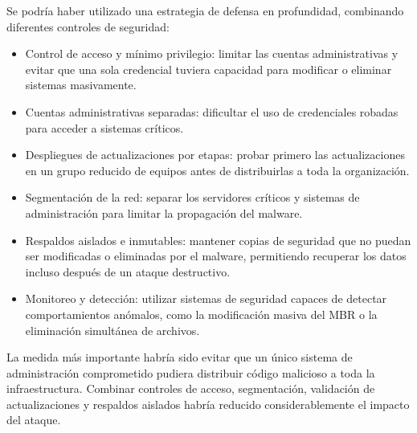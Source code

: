 \begin{respuesta}
Se podría haber utilizado una estrategia de defensa en profundidad, combinando diferentes controles de seguridad:
\begin{itemize}
  \item Control de acceso y mínimo privilegio: limitar las cuentas administrativas y evitar que una sola credencial tuviera capacidad para modificar o eliminar sistemas masivamente.  

\item Cuentas administrativas separadas: dificultar el uso de credenciales robadas para acceder a sistemas críticos.  

\item Despliegues de actualizaciones por etapas: probar primero las actualizaciones en un grupo reducido de equipos antes de distribuirlas a toda la organización.  

\item Segmentación de la red: separar los servidores críticos y sistemas de administración para limitar la propagación del malware.  

\item Respaldos aislados e inmutables: mantener copias de seguridad que no puedan ser modificadas o eliminadas por el malware, permitiendo recuperar los datos incluso después de un ataque destructivo.  

\item Monitoreo y detección: utilizar sistemas de seguridad capaces de detectar comportamientos anómalos, como la modificación masiva del MBR o la eliminación simultánea de archivos.  
\end{itemize}
La medida más importante habría sido evitar que un único sistema de administración comprometido pudiera distribuir código malicioso a toda la infraestructura. Combinar controles de acceso, segmentación, validación de actualizaciones y respaldos aislados habría reducido considerablemente el impacto del ataque. 
\end{respuesta}



